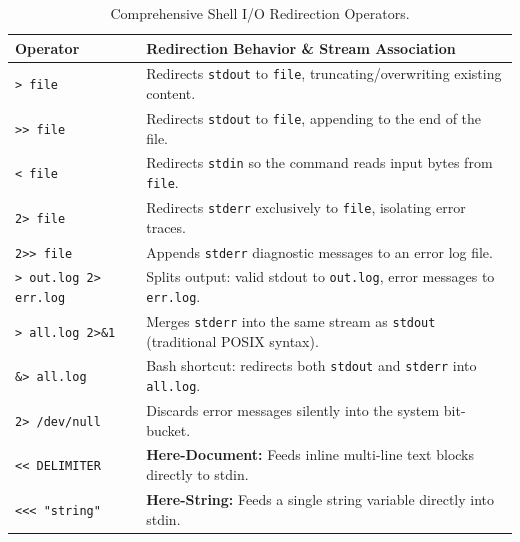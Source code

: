 \begin{table}[htbp]
\centering
\small
\begin{tabularx}{\linewidth}{l X}
\toprule
\textbf{Operator} & \textbf{Redirection Behavior \& Stream Association} \\
\midrule
\texttt{> file} & Redirects \texttt{stdout} to \texttt{file}, truncating/overwriting existing content. \\
\texttt{>> file} & Redirects \texttt{stdout} to \texttt{file}, appending to the end of the file. \\
\texttt{< file} & Redirects \texttt{stdin} so the command reads input bytes from \texttt{file}. \\
\texttt{2> file} & Redirects \texttt{stderr} exclusively to \texttt{file}, isolating error traces. \\
\texttt{2>> file} & Appends \texttt{stderr} diagnostic messages to an error log file. \\
\texttt{> out.log 2> err.log} & Splits output: valid stdout to \texttt{out.log}, error messages to \texttt{err.log}. \\
\texttt{> all.log 2>\&1} & Merges \texttt{stderr} into the same stream as \texttt{stdout} (traditional POSIX syntax). \\
\texttt{\&> all.log} & Bash shortcut: redirects both \texttt{stdout} and \texttt{stderr} into \texttt{all.log}. \\
\texttt{2> /dev/null} & Discards error messages silently into the system bit-bucket. \\
\texttt{<< DELIMITER} & \textbf{Here-Document:} Feeds inline multi-line text blocks directly to stdin. \\
\texttt{<<< "string"} & \textbf{Here-String:} Feeds a single string variable directly into stdin. \\
\bottomrule
\end{tabularx}
\caption{Comprehensive Shell I/O Redirection Operators.}
\label{tab:redirection}
\end{table}


